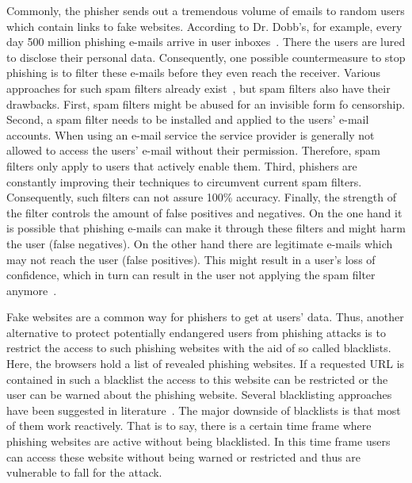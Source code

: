\begin{description}[leftmargin=0cm]
	\item[Spam filters] Commonly, the phisher sends out a tremendous volume of emails to random users which contain links to fake websites.
According to Dr. Dobb's, for example, every day 500 million phishing e-mails arrive in user inboxes~\cite{drdobb2012email}.
 There the users are lured to disclose their personal data.
 Consequently, one possible countermeasure to stop phishing is to filter these e-mails before they even reach the receiver.
 Various approaches for such spam filters already exist~\cite{bergholz2010new,chandrasekaran2006phishing,fette2007learning}, but spam filters also have their drawbacks.
 First, spam filters might be abused for an invisible form fo censorship.
 Second, a spam filter needs to be installed and applied to the users' e-mail accounts.
 When using an e-mail service the service provider is generally not allowed to access the users' e-mail without their permission.
 Therefore, spam filters only apply to users that actively enable them.
 Third, phishers are constantly improving their techniques to circumvent current spam filters.
 Consequently, such filters can not assure 100\% accuracy.
 Finally, the strength of the filter controls the amount of false positives and negatives.
 On the one hand it is possible that phishing e-mails can make it through these filters and might harm the user (false negatives). 
On the other hand there are legitimate e-mails which may not reach the user (false positives). 
This might result in a user's loss of confidence, which in turn can result in the user not applying the spam filter anymore~\cite{olivo2011obtaining}.
	\item[Blacklists] Fake websites are a common way for phishers to get at users' data.
 Thus, another alternative to protect potentially endangered users from phishing attacks is to restrict the access to such phishing websites with the aid of so called blacklists.
 Here, the browsers hold a list of revealed phishing websites.
 If a requested URL is contained in such a blacklist the access to this website can be restricted or the user can be warned about the phishing website.
 Several blacklisting approaches have been suggested in literature~\cite{ma2009beyond, zhang2008highly}. The major downside of blacklists is that most of them work reactively.
 That is to say, there is a certain time frame where phishing websites are active without being blacklisted.
 In this time frame users can access these website without being warned or restricted and thus are vulnerable to fall for the attack.

\end{description}
